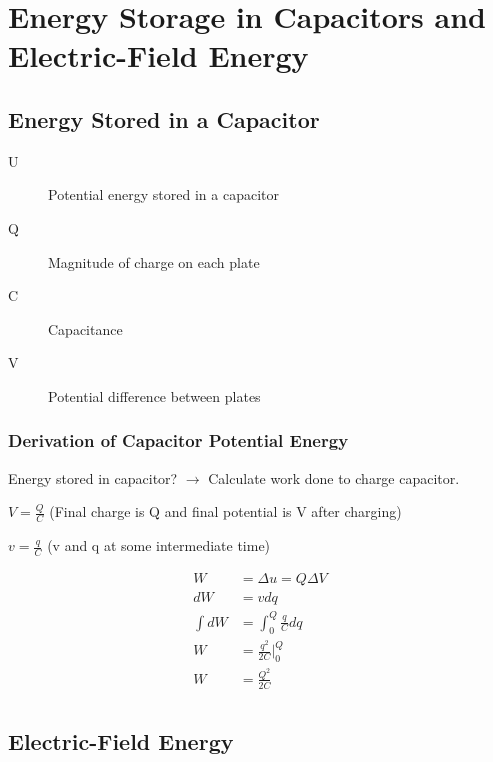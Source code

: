 
\section{Energy Storage in Capacitors and Electric-Field Energy}%
\label{sec:energy_storage_in_capacitors_and_electric_field_energy}


\subsection{Energy Stored in a Capacitor}%
\label{sub:energy_stored_in_a_capacitor}



\begin{description}
	\item[U] Potential energy stored in a capacitor
	\item[Q] Magnitude of charge on each plate
	\item[C] Capacitance
	\item[V] Potential difference between plates
\end{description}

\subsubsection{Derivation of Capacitor Potential Energy}%
\label{ssub:derivation_of_capacitor_potential_energy}

Energy stored in capacitor? $\to$ Calculate work done to charge capacitor.

$V = \frac{Q}{C}$ (Final charge is Q and final potential is V after charging)

$v = \frac{q}{C}$ (v and q at some intermediate time)

\begin{align*}
	W &=  \Delta u = Q\Delta V \\
	dW &=  v dq \\
	\int dW &=  \int_{0}^{Q} \frac{q}{C}dq  \\
W &=  \frac{q^2}{2C}\biggr\rvert_{0}^{Q}   \\
W &= \frac{Q^2}{2C} \\
\end{align*}

\subsection{Electric-Field Energy}%
\label{sub:electric_field_energy}

